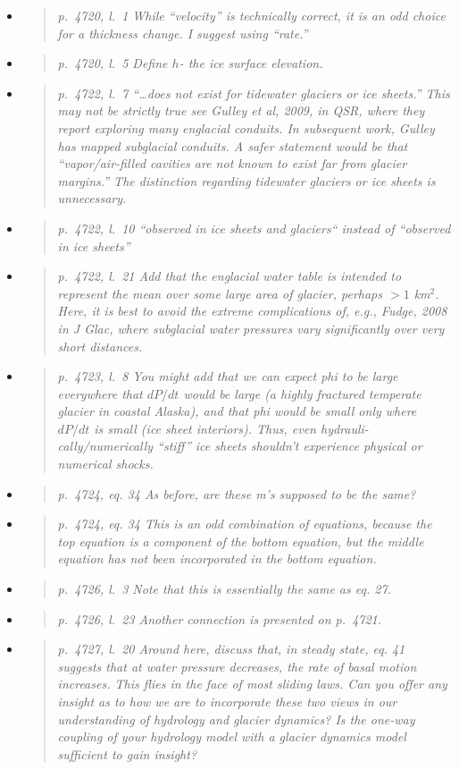 \documentclass[11pt,reqno]{amsart}
\newcommand{\reply}[2]{
\medskip\medskip
\item  \begin{quote}
\emph{#1}
\end{quote}

\medskip
\noindent #2}
\begin{document}
\begin{itemize}
\reply{p.~4720, l.~1  While ``velocity'' is technically correct, it is an odd choice for a thickness
change. I suggest using ``rate.''}
{}

\reply{p.~4720, l.~5 Define $h$- the ice surface elevation.}
{}

\reply{p.~4722, l.~7 ``\dots does not exist for tidewater glaciers or ice sheets.'' This may not
be strictly true see Gulley et al, 2009, in QSR, where they report exploring many
englacial conduits. In subsequent work, Gulley has mapped subglacial conduits. A
safer statement would be that ``vapor/air-filled cavities are not known to exist far from
glacier margins.''  The distinction regarding tidewater glaciers or ice sheets is unnecessary.}
{}

\reply{p.~4722, l.~10 ``observed in ice sheets and glaciers`` instead of ``observed in ice sheets''}
{}

\reply{p.~4722, l.~21 Add that the englacial water table is intended to represent the mean
over some large area of glacier, perhaps $>1$ km$^2$. Here, it is best to avoid the extreme
complications of, e.g., Fudge, 2008 in J Glac, where subglacial water pressures vary
significantly over very short distances.}
{}

\reply{p.~4723, l.~8 You might add that we can expect phi to be large everywhere that $dP/dt$
would be large (a highly fractured temperate glacier in coastal Alaska), and that phi
would be small only where $dP/dt$ is small (ice sheet interiors). Thus, even hydrauli-
cally/numerically ``stiff'' ice sheets shouldn’t experience physical or numerical shocks.}
{}

\reply{p.~4724, eq. 34 As before, are these m's supposed to be the same?}
{}

\reply{p.~4724, eq. 34 This is an odd combination of equations, because the top equation is a
component of the bottom equation, but the middle equation has not been incorporated
in the bottom equation.}
{}

\reply{p.~4726, l.~3 Note that this is essentially the same as eq. 27.}
{}

\reply{p.~4726, l.~23 Another connection is presented on p.~4721.}
{}

\reply{p.~4727, l.~20 Around here, discuss that, in steady state, eq. 41 suggests that at water
pressure decreases, the rate of basal motion increases. This flies in the face of most
sliding laws. Can you offer any insight as to how we are to incorporate these two views
in our understanding of hydrology and glacier dynamics? Is the one-way coupling of
your hydrology model with a glacier dynamics model sufficient to gain insight?}
{}


\end{itemize}
\end{document}
